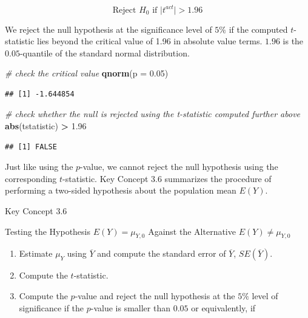\documentclass[]{book}
\newenvironment{Shaded}{\begin{snugshade}}{\end{snugshade}}
\newcommand{\KeywordTok}[1]{\textcolor[rgb]{0.13,0.29,0.53}{\textbf{#1}}}
\newcommand{\DataTypeTok}[1]{\textcolor[rgb]{0.13,0.29,0.53}{#1}}
\newcommand{\FloatTok}[1]{\textcolor[rgb]{0.00,0.00,0.81}{#1}}
\newcommand{\StringTok}[1]{\textcolor[rgb]{0.31,0.60,0.02}{#1}}
\newcommand{\CommentTok}[1]{\textcolor[rgb]{0.56,0.35,0.01}{\textit{#1}}}
\newcommand{\OperatorTok}[1]{\textcolor[rgb]{0.81,0.36,0.00}{\textbf{#1}}}
\newcommand{\NormalTok}[1]{#1}
\theoremstyle{definition}
\theoremstyle{definition}
\theoremstyle{definition}
\theoremstyle{remark}
\begin{document}
\[ \text{Reject } H_0 \text{ if } \lvert t^{act} \rvert > 1.96 \]

We reject the null hypothesis at the significance level of \(5\%\) if
the computed \(t\)-statistic lies beyond the critical value of 1.96 in
absolute value terms. \(1.96\) is the \(0.05\)-quantile of the standard
normal distribution.

\begin{Shaded}
\begin{Highlighting}[]
\CommentTok{# check the critical value}
\KeywordTok{qnorm}\NormalTok{(}\DataTypeTok{p =} \FloatTok{0.05}\NormalTok{)}
\end{Highlighting}
\end{Shaded}

\begin{verbatim}
## [1] -1.644854
\end{verbatim}

\begin{Shaded}
\begin{Highlighting}[]
\CommentTok{# check whether the null is rejected using the t-statistic computed further above}
\KeywordTok{abs}\NormalTok{(tstatistic) }\OperatorTok{>}\StringTok{ }\FloatTok{1.96}
\end{Highlighting}
\end{Shaded}

\begin{verbatim}
## [1] FALSE
\end{verbatim}

Just like using the \(p\)-value, we cannot reject the null hypothesis
using the corresponding \(t\)-statistic. Key Concept 3.6 summarizes the
procedure of performing a two-sided hypothesis about the population mean
\(E(Y)\).

Key Concept 3.6

Testing the Hypothesis \(E(Y) = \mu_{Y,0}\) Against the Alternative
\(E(Y) \neq \mu_{Y,0}\)

\begin{enumerate}
\def\labelenumi{\arabic{enumi}.}
\item
  Estimate \(\mu_{Y}\) using \(\overline{Y}\) and compute the standard
  error of \(\overline{Y}\), \(SE(\overline{Y})\).
\item
  Compute the \(t\)-statistic.
\item
  Compute the \(p\)-value and reject the null hypothesis at the \(5\%\)
  level of significance if the \(p\)-value is smaller than \(0.05\) or
  equivalently, if
\end{enumerate}
\end{document}
